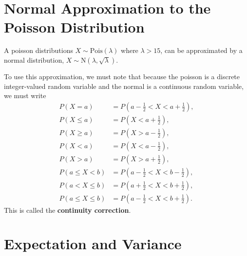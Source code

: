 \section{Normal Approximation to the Poisson Distribution} \label{mod2:section:NormalApproxPois}

\begin{defn}\label{mod2:def:NormalApproxToPois:Definition}
	A poisson distributions $X \sim \text{Pois}(\lambda)$ where $\lambda > 15$, can be approximated by a normal distribution, $X \sim \text{N}(\lambda, \sqrt{\lambda})$.
\end{defn}

\begin{note}\label{mod2:note:NormalApproxtoPois:Continuity}
	To use this approximation, we must note that because the poisson is a discrete integer-valued random variable and the normal is a continuous random variable, we must write
	\begin{align}
	P(X=a) &= P \left( a -\frac{1}{2} < X < a + \frac{1}{2} \right), \\
	P(X \leq a) &= P \left( X < a + \frac{1}{2} \right), \\
	P(X \geq a) &= P \left( X > a - \frac{1}{2} \right), \\
	P(X < a) &= P \left( X < a - \frac{1}{2} \right), \\
	P(X > a) &= P \left( X > a + \frac{1}{2} \right), \\
	P(a \leq X < b) &= P \left( a - \frac{1}{2} < X < b - \frac{1}{2} \right), \\
	P(a < X \leq  b) &= P \left( a + \frac{1}{2} < X < b + \frac{1}{2} \right), \\
	P(a  \leq  X \leq  b) &= P \left( a - \frac{1}{2} < X < b + \frac{1}{2} \right).
	\end{align}
	This is called the \textbf{continuity correction}.
\end{note}


\section{Expectation and Variance} \label{mod2:section:ExpectationVariance}

